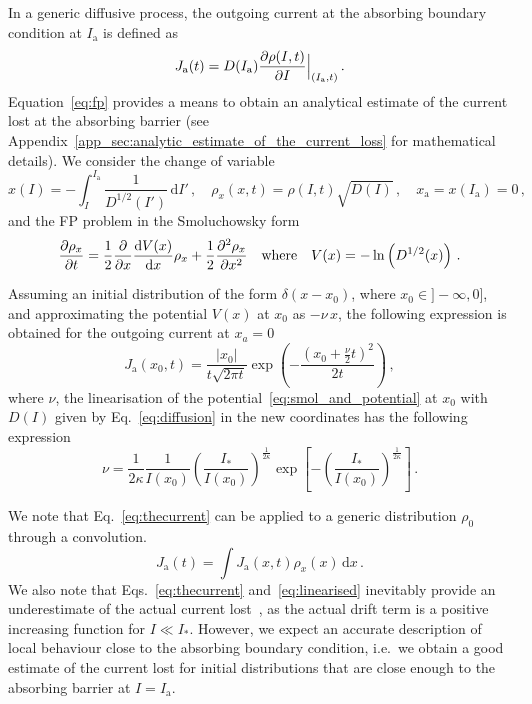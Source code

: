 In a generic diffusive process, the outgoing current at the absorbing boundary condition at $I_\mathrm{a}$ is defined as
\begin{equation}
    J_\mathrm{a}(t) = D(I_\mathrm{a})\pdv{\rho(I, t)}{I} \Bigr|_{(I_\mathrm{a}, t)}\,.
    \label{eq:outgoing_current_definition}
\end{equation}
Equation~\eqref{eq:fp} provides a means to obtain an analytical estimate of the current lost at the absorbing barrier (see Appendix~\ref{app_sec:analytic_estimate_of_the_current_loss} for mathematical details). We consider the change of variable
\begin{equation}
    x(I) = -\int_I^{I_\mathrm{a}} \frac{1}{D^{1/2}(I')}\,\mathrm{d}I' \,, \quad \rho_x(x,t) = \rho(I, t) \sqrt{D(I)} \,, \quad x_\mathrm{a}=x(I_\mathrm{a})=0 \, ,
    \label{eq:change_of_variable}
\end{equation}
and the FP problem in the Smoluchowsky form
\begin{equation}
    \pdv{\rho_x}{t} = \frac{1}{2}\pdv{x} \dv{V(x)}{x} \rho_x+\frac{1}{2}\pdv[2]{\rho_x}{x} \quad \text{where} \quad V(x) = -\ln\left(D^{1/2}(x)\right) \, .
    \label{eq:smol_and_potential}
\end{equation}

Assuming an initial distribution of the form $\delta(x - x_0)$, where $x_0 \in ] -\infty, 0]$, and approximating the potential $V(x)$ at $x_0$ as $-\nu \, x$, the following expression is obtained for the outgoing current at $x_a = 0$
\begin{equation}
    J_\mathrm{a}(x_0, t) = \frac{|x_0|}{t\sqrt{2\pi t}}\exp\left(-\frac{(x_0+\frac{\nu}{2}t)^2}{2t}\right) \,,
    \label{eq:thecurrent}
\end{equation}
where $\nu$, the linearisation of the potential~\eqref{eq:smol_and_potential} at $x_0$ with $D(I)$ given by Eq.~\eqref{eq:diffusion} in the new coordinates has the following expression
\begin{equation}
    \nu=\frac{1}{2\kappa}\frac{1}{I(x_0)}\left(\frac{I_\ast}{I(x_0)}\right)^{\frac{1}{2\kappa}}\exp\left[-\left(\frac{I_\ast}{I(x_0)}\right)^{\frac{1}{2\kappa}}\right]\,.
    \label{eq:linearised}
\end{equation}

We note that Eq.~\eqref{eq:thecurrent} can be applied to a generic distribution $\rho_0$ through a convolution.
\begin{equation}
    J_\mathrm{a}(t) = \int J_\mathrm{a}(x,t)\rho_x(x)\,\mathrm{d}x\,.
    \label{eq:current_convolution}
\end{equation}
We also note that Eqs.~\eqref{eq:thecurrent} and~\eqref{eq:linearised} inevitably provide an underestimate of the actual current lost~\cite{montanari:ipac2021:tupab233}, as the actual drift term is a positive increasing function for $I\ll I_\ast$. However, we expect an accurate description of local behaviour close to the absorbing boundary condition, i.e.\ we obtain a good estimate of the current lost for initial distributions that are close enough to the absorbing barrier at $I=I_\mathrm{a}$. 

